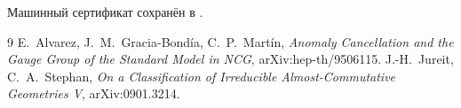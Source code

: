 Машинный сертификат сохранён в
.

\begin{thebibliography}{9}
E.~Alvarez, J.~M.~Gracia-Bond\'ia, C.~P.~Mart\'in,
\emph{Anomaly Cancellation and the Gauge Group of the Standard Model in NCG},
arXiv:hep-th/9506115.
J.-H.~Jureit, C.~A.~Stephan,
\emph{On a Classification of Irreducible Almost-Commutative Geometries V},
arXiv:0901.3214.
\end{thebibliography}